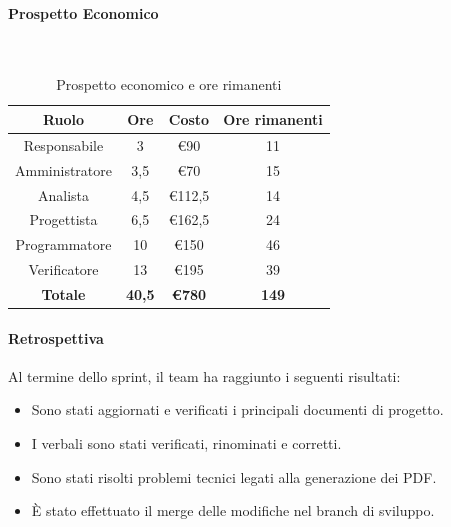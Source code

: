 \documentclass{article}
\begin{document}
                \paragraph{Prospetto Economico}\mbox{}\\
                \begin{table}[H]
                    \centering
                    \begin{tabular}{|c|c|c|c|}
                    \hline
                    \textbf{Ruolo}  & \textbf{Ore}  & \textbf{Costo} & \textbf{Ore rimanenti} \\ \hline
                    Responsabile    & 3             & €90            & 11                     \\ \hline
                    Amministratore  & 3,5           & €70            & 15                   \\ \hline
                    Analista        & 4,5           & €112,5          & 14                   \\ \hline
                    Progettista     & 6,5           & €162,5         & 24                   \\ \hline
                    Programmatore   & 10            & €150           & 46                     \\ \hline
                    Verificatore    & 13            & €195           & 39                     \\ \hline
                    \textbf{Totale} & \textbf{40,5} & \textbf{\euro780}   & \textbf{149}         \\ \hline
                    \end{tabular}
                    \caption{Prospetto economico e ore rimanenti}
                \end{table}

                \paragraph{Retrospettiva}
                Al termine dello sprint, il team ha raggiunto i seguenti risultati:
                \begin{itemize}
                    \item Sono stati aggiornati e verificati i principali documenti di progetto.
                    \item I verbali sono stati verificati, rinominati e corretti.
                    \item Sono stati risolti problemi tecnici legati alla generazione dei PDF.
                    \item È stato effettuato il merge delle modifiche nel branch di sviluppo.
                \end{itemize}
                
\end{document}
